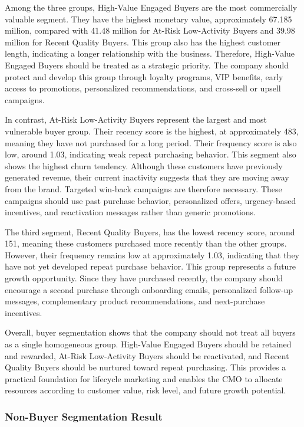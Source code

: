\documentclass[conference]{IEEEtran}
\begin{document}
Among the three groups, High-Value Engaged Buyers are the most commercially valuable segment. They have the highest monetary value, approximately 67.185 million, compared with 41.48 million for At-Risk Low-Activity Buyers and 39.98 million for Recent Quality Buyers. This group also has the highest customer length, indicating a longer relationship with the business. Therefore, High-Value Engaged Buyers should be treated as a strategic priority. The company should protect and develop this group through loyalty programs, VIP benefits, early access to promotions, personalized recommendations, and cross-sell or upsell campaigns.

In contrast, At-Risk Low-Activity Buyers represent the largest and most vulnerable buyer group. Their recency score is the highest, at approximately 483, meaning they have not purchased for a long period. Their frequency score is also low, around 1.03, indicating weak repeat purchasing behavior. This segment also shows the highest churn tendency. Although these customers have previously generated revenue, their current inactivity suggests that they are moving away from the brand. Targeted win-back campaigns are therefore necessary. These campaigns should use past purchase behavior, personalized offers, urgency-based incentives, and reactivation messages rather than generic promotions.

The third segment, Recent Quality Buyers, has the lowest recency score, around 151, meaning these customers purchased more recently than the other groups. However, their frequency remains low at approximately 1.03, indicating that they have not yet developed repeat purchase behavior. This group represents a future growth opportunity. Since they have purchased recently, the company should encourage a second purchase through onboarding emails, personalized follow-up messages, complementary product recommendations, and next-purchase incentives.

Overall, buyer segmentation shows that the company should not treat all buyers as a single homogeneous group. High-Value Engaged Buyers should be retained and rewarded, At-Risk Low-Activity Buyers should be reactivated, and Recent Quality Buyers should be nurtured toward repeat purchasing. This provides a practical foundation for lifecycle marketing and enables the CMO to allocate resources according to customer value, risk level, and future growth potential.

\subsubsection{Non-Buyer Segmentation Result}
\end{document}
